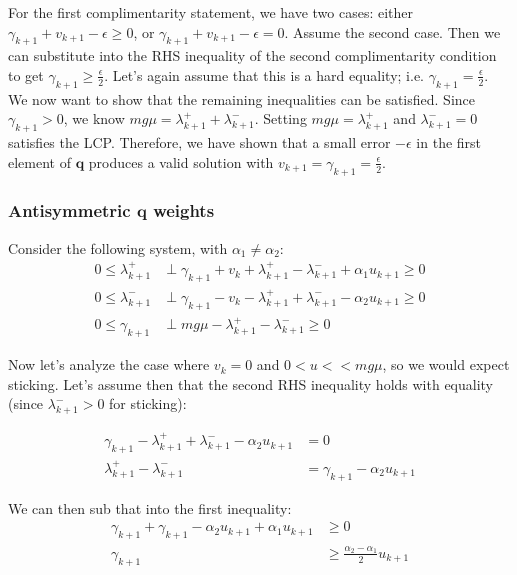 \documentclass{article}
\renewcommand{\vec}[1]{\boldsymbol{#1}}
\begin{document}
For the first complimentarity statement, we have two cases: either $\gamma_{k+1} + v_{k+1} - \epsilon \geq 0$, or $\gamma_{k+1} + v_{k+1} - \epsilon = 0$. Assume the second case. Then we can substitute into the RHS inequality of the second complimentarity condition to get $\gamma_{k+1} \geq \frac{\epsilon}{2}$. Let's again assume that this is a hard equality; i.e. $\gamma_{k+1} = \frac{\epsilon}{2}$. We now want to show that the remaining inequalities can be satisfied. Since $\gamma_{k+1} > 0$, we know $m g \mu = \lambda^+_{k+1} + \lambda^-_{k+1}$. Setting $m g \mu = \lambda^+_{k+1}$ and $\lambda^-_{k+1} = 0$ satisfies the LCP. Therefore, we have shown that a small error $-\epsilon$ in the first element of $\vec{q}$ produces a valid solution with $v_{k+1} = \gamma_{k+1} = \frac{\epsilon}{2}$. 

\subsubsection{Antisymmetric $\vec{q}$ weights}
Consider the following system, with $\alpha_1 \neq \alpha_2$:
\begin{align*}
    0 \leq \lambda^+_{k+1} &\perp \gamma_{k+1} + v_k + \lambda^+_{k+1} - \lambda^-_{k+1} + \alpha_1 u_{k+1} \geq 0 \\
    0 \leq \lambda^-_{k+1} &\perp \gamma_{k+1} - v_k - \lambda^+_{k+1} + \lambda^-_{k+1} - \alpha_2 u_{k+1} \geq 0 \\
    0 \leq \gamma_{k+1} &\perp m g \mu - \lambda^+_{k+1} - \lambda^-_{k+1} \geq 0
\end{align*}

Now let's analyze the case where $v_k = 0$ and $0 < u << m g \mu$, so we would expect sticking. Let's assume then that the second RHS inequality holds with equality (since $\lambda^-_{k+1} > 0$ for sticking):

\begin{align*}
    \gamma_{k+1} - \lambda^+_{k+1} + \lambda^-_{k+1} - \alpha_2 u_{k+1} &= 0 \\
    \lambda^+_{k+1} - \lambda^-_{k+1} &= \gamma_{k+1} - \alpha_2 u_{k+1}
\end{align*}

We can then sub that into the first inequality:
\begin{align*}
    \gamma_{k+1} + \gamma_{k+1} - \alpha_2 u_{k+1} + \alpha_1 u_{k+1} &\geq 0 \\
    \gamma_{k+1} &\geq \frac{\alpha_2 - \alpha_1}{2} u_{k+1}
\end{align*}
\end{document}
